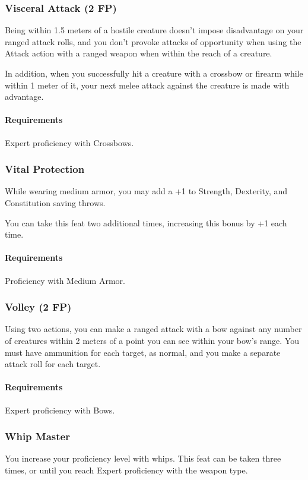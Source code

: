 \subsubsection{Visceral Attack (2 FP)} \label{feat::visceralattack}
    Being within 1.5 meters of a hostile creature doesn't impose disadvantage on your ranged attack rolls, and you don't provoke attacks of opportunity when using the Attack action with a ranged weapon when within the reach of a creature.

    In addition, when you successfully hit a creature with a crossbow or firearm while within 1 meter of it, your next melee attack against the creature is made with advantage.
    \paragraph{Requirements} Expert proficiency with Crossbows.
\subsubsection{Vital Protection} \label{feat::vitalprotection}
    While wearing medium armor, you may add a +1 to Strength, Dexterity, and Constitution saving throws.

    You can take this feat two additional times, increasing this bonus by +1 each time.
    \paragraph{Requirements} Proficiency with Medium Armor.
\subsubsection{Volley (2 FP)} \label{feat::volley}
    Using two actions, you can make a ranged attack with a bow against any number of creatures within 2 meters of a point you can see within your bow's range.
    You must have ammunition for each target, as normal, and you make a separate attack roll for each target.
    \paragraph{Requirements} Expert proficiency with Bows.
\subsubsection{Whip Master} \label{feat::whipmaster}
    You increase your proficiency level with whips.
    This feat can be taken three times, or until you reach Expert proficiency with the weapon type.
